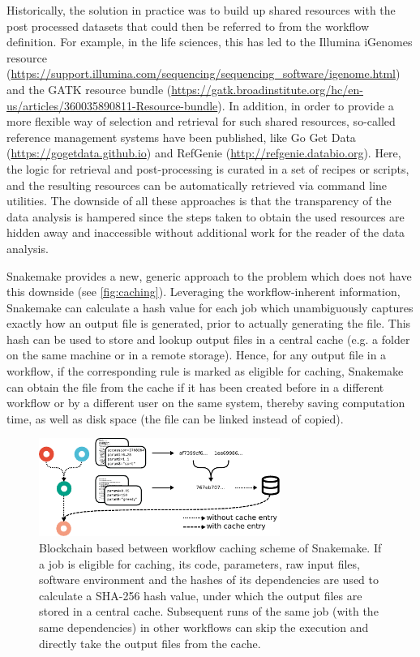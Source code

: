 \documentclass[parskip=half]{scrartcl}
\let\plainurl\url
\renewcommand{\url}[1]{\protect\plainurl{#1}}
\begin{document}
Historically, the solution in practice was to build up shared resources with the post processed datasets that could then be referred to from the workflow definition.
For example, in the life sciences, this has led to the Illumina iGenomes resource (\url{https://support.illumina.com/sequencing/sequencing\_software/igenome.html}) and the GATK resource bundle (\url{https://gatk.broadinstitute.org/hc/en-us/articles/360035890811-Resource-bundle}).
In addition, in order to provide a more flexible way of selection and retrieval for such shared resources, so-called reference management systems have been published, like Go Get Data (\url{https://gogetdata.github.io}) and RefGenie (\url{http://refgenie.databio.org}).
Here, the logic for retrieval and post-processing is curated in a set of recipes or scripts, and the resulting resources can be automatically retrieved via command line utilities.
The downside of all these approaches is that the transparency of the data analysis is hampered since the steps taken to obtain the used resources are hidden away and inaccessible without additional work for the reader of the data analysis.

Snakemake provides a new, generic approach to the problem which does not have this downside (see \autoref{fig:caching}).
Leveraging the workflow-inherent information, Snakemake can calculate a hash value for each job which unambiguously captures exactly how an output file is generated, prior to actually generating the file.
This hash can be used to store and lookup output files in a central cache (e.g. a folder on the same machine or in a remote storage).
Hence, for any output file in a workflow, if the corresponding rule is marked as eligible for caching, Snakemake can obtain the file from the cache if it has been created before in a different workflow or by a different user on the same system, thereby saving computation time, as well as disk space (the file can be linked instead of copied).

\begin{figure}
	\centering
	\includegraphics[width=0.7\textwidth]{caching.pdf}
	\caption{
		Blockchain based between workflow caching scheme of Snakemake.
		If a job is eligible for caching, its code, parameters, raw input files, software environment and the hashes of its dependencies are used to calculate a SHA-256 hash value, under which the output files are stored in a central cache.
		Subsequent runs of the same job (with the same dependencies) in other workflows can skip the execution and directly take the output files from the cache.
	}
	\label{fig:caching}
\end{figure}
\end{document}
